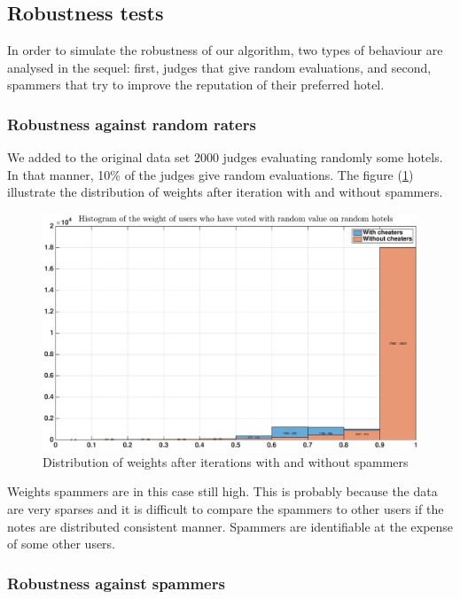 \documentclass[12pt,a4paper]{article}
\begin{document}
\subsection{Robustness tests}

In order to simulate the robustness of our algorithm, two types of behaviour are analysed in the sequel: first, judges that give random evaluations, and second, spammers that try to improve the reputation of their preferred hotel.

\subsubsection*{Robustness against random raters}
We added to the original data set 2000 judges evaluating randomly some hotels. In that manner, 10\% of the judges give random evaluations. The figure (\ref{fig:hotel:random_cheaters}) illustrate the distribution of weights after iteration with and without spammers.

\begin{figure}[!h]
\centering
\includegraphics[width = \textwidth]{hotels/random_cheaters.eps}
\caption{\label{fig:hotel:random_cheaters} Distribution of weights after iterations with and without spammers}
\end{figure}

Weights spammers are in this case still high. This is probably because the data are very sparses and it is difficult to compare the spammers to other users if the notes are distributed consistent manner. Spammers are identifiable at the expense of some other users.

\subsubsection*{Robustness against spammers}
\end{document}
